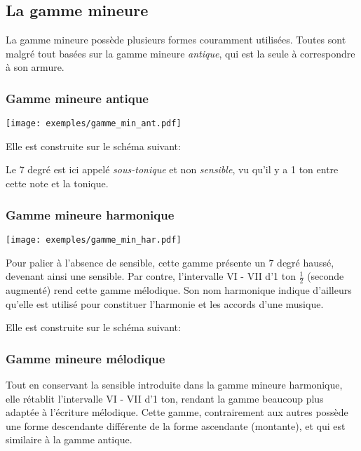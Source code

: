\subsection{La gamme mineure}
La gamme mineure possède plusieurs formes couramment utilisées. Toutes sont malgré tout basées sur la gamme mineure \emph{antique}, qui est la seule à correspondre à son armure.

\subsubsection{Gamme mineure antique\label{min_ant}}
\begin{center}
\texttt{[image: exemples/gamme\_min\_ant.pdf]}
\end{center}

Elle est construite sur le schéma suivant: 
\begin{center}
\end{center}
Le 7\ieme{} degré est ici appelé \emph{sous-tonique} et non \emph{sensible}, vu qu'il y a 1 ton entre cette note et la tonique.

\subsubsection{Gamme mineure harmonique}
\begin{center}
\texttt{[image: exemples/gamme\_min\_har.pdf]}
\end{center}

Pour palier à l'absence de sensible, cette gamme présente un 7\ieme{} degré haussé, devenant ainsi une sensible. Par contre, l'intervalle VI - VII d'1 ton $\frac1 2$ (seconde augmenté) rend cette gamme mélodique. Son nom  \og harmonique \fg{} indique d'ailleurs qu'elle est utilisé pour constituer l'harmonie et les accords d'une musique.

Elle est construite sur le schéma suivant: 
\begin{center}
\end{center}

\subsubsection{Gamme mineure mélodique}
Tout en conservant la sensible introduite dans la gamme mineure harmonique, elle rétablit l'intervalle VI - VII d'1 ton, rendant la gamme beaucoup plus adaptée à l'écriture mélodique. Cette gamme, contrairement aux autres possède une forme descendante différente de la forme ascendante (montante), et qui est similaire à la gamme antique.

